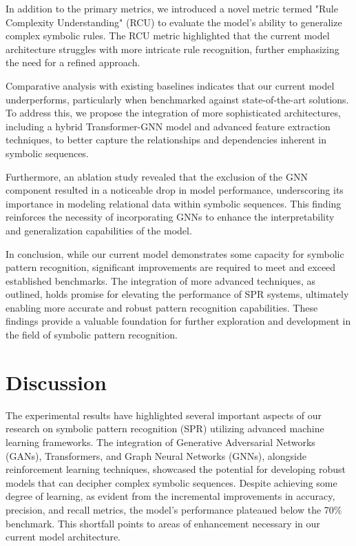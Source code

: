 \documentclass{article}
\begin{document}
In addition to the primary metrics, we introduced a novel metric termed "Rule Complexity Understanding" (RCU) to evaluate the model's ability to generalize complex symbolic rules. The RCU metric highlighted that the current model architecture struggles with more intricate rule recognition, further emphasizing the need for a refined approach.

Comparative analysis with existing baselines indicates that our current model underperforms, particularly when benchmarked against state-of-the-art solutions. To address this, we propose the integration of more sophisticated architectures, including a hybrid Transformer-GNN model and advanced feature extraction techniques, to better capture the relationships and dependencies inherent in symbolic sequences.

Furthermore, an ablation study revealed that the exclusion of the GNN component resulted in a noticeable drop in model performance, underscoring its importance in modeling relational data within symbolic sequences. This finding reinforces the necessity of incorporating GNNs to enhance the interpretability and generalization capabilities of the model.

In conclusion, while our current model demonstrates some capacity for symbolic pattern recognition, significant improvements are required to meet and exceed established benchmarks. The integration of more advanced techniques, as outlined, holds promise for elevating the performance of SPR systems, ultimately enabling more accurate and robust pattern recognition capabilities. These findings provide a valuable foundation for further exploration and development in the field of symbolic pattern recognition.

\section{Discussion}
The experimental results have highlighted several important aspects of our research on symbolic pattern recognition (SPR) utilizing advanced machine learning frameworks. The integration of Generative Adversarial Networks (GANs), Transformers, and Graph Neural Networks (GNNs), alongside reinforcement learning techniques, showcased the potential for developing robust models that can decipher complex symbolic sequences. Despite achieving some degree of learning, as evident from the incremental improvements in accuracy, precision, and recall metrics, the model's performance plateaued below the 70\% benchmark. This shortfall points to areas of enhancement necessary in our current model architecture.
\end{document}
